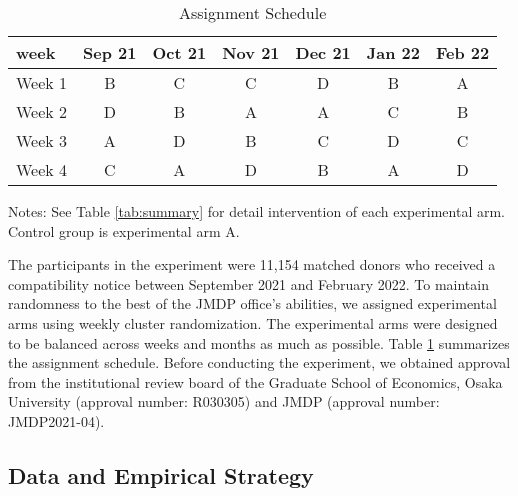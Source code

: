 \documentclass[
  11pt,
  a4paper
]{article}
\begin{document}
\begin{table}

\caption{\label{tab:assignment}Assignment Schedule}
\centering
\fontsize{9}{11}\selectfont
\fontsize{9}{11}\selectfont
\begin{threeparttable}
\begin{tabular}[t]{lcccccc}
\toprule
week & Sep 21 & Oct 21 & Nov 21 & Dec 21 & Jan 22 & Feb 22\\
\midrule
Week 1 & B & C & C & D & B & A\\
Week 2 & D & B & A & A & C & B\\
Week 3 & A & D & B & C & D & C\\
Week 4 & C & A & D & B & A & D\\
\bottomrule
\end{tabular}
\begin{tablenotes}
\item Notes: See Table \ref{tab:summary} for detail intervention of each experimental arm. Control group is experimental arm A.
\end{tablenotes}
\end{threeparttable}
\end{table}

The participants in the experiment were 11,154 matched donors who received a compatibility notice between September 2021 and February 2022. To maintain randomness to the best of the JMDP office's abilities, we assigned experimental arms using weekly cluster randomization. The experimental arms were designed to be balanced across weeks and months as much as possible. Table \ref{tab:assignment} summarizes the assignment schedule. Before conducting the experiment, we obtained approval from the institutional review board of the Graduate School of Economics, Osaka University (approval number: R030305) and JMDP (approval number: JMDP2021-04).

\hypertarget{data-and-empirical-strategy}{%
\subsection{Data and Empirical Strategy}\label{data-and-empirical-strategy}}
\end{document}
